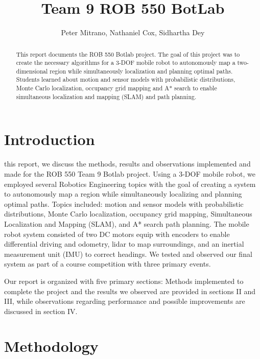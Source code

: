\documentclass[journal]{IEEEtran}
\begin{document}
\title{Team 9 ROB 550 BotLab}

\author{Peter Mitrano, Nathaniel Cox, Sidhartha Dey}

\maketitle

\begin{abstract}
    This report documents the ROB 550 Botlab project. The goal of this project was to create the necessary algorithms for a 3-DOF mobile robot to autonomously map a two-dimensional region while simultaneously localization and planning optimal paths. Students learned about motion and sensor models with probabilistic distributions, Monte Carlo localization, occupancy grid mapping and A* search to enable simultaneous localization and mapping (SLAM) and path planning. 
\end{abstract}
\IEEEpeerreviewmaketitle

\section{Introduction}
 this report, we discuss the methods, results and observations implemented and made for the ROB 550  Team 9 Botlab project. Using a 3-DOF mobile robot, we employed several Robotics Engineering topics with the goal of creating a system to autonomously map a region while simultaneously localizing and planning optimal paths. Topics included: motion and sensor models with probabilistic distributions, Monte Carlo localization, occupancy grid mapping, Simultaneous Localization and Mapping (SLAM), and A* search path planning. The mobile robot system consisted of two DC motors equip with encoders to enable differential driving and odometry, lidar to map surroundings, and an inertial measurement unit (IMU) to correct headings. We tested and observed our final system as part of a course competition with three primary events. 

Our report is organized with five primary sections: Methods implemented to complete the project and the results we observed are provided in sections II and III, while observations regarding performance and possible improvements are discussed in section IV.

\section{Methodology}
\end{document}
